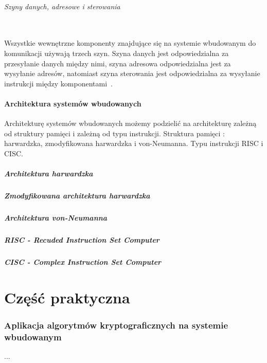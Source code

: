 \documentclass[12p]{article}
\begin{document}
\paragraph{Szyny danych, adresowe i sterowania} \mbox{} \\

Wszystkie wewnętrzne komponenty znajdujące się na systemie wbudowanym  do komunikacji używają trzech szyn. Szyna danych jest odpowiedzialna za przesyłanie danych między nimi, szyna adresowa odpowiedzialna jest za wysyłanie adresów, natomiast szyna sterowania jest odpowiedzialna za wysyłanie instrukcji między komponentami~\cite{es}.


\subsection{Architektura systemów wbudowanych}
\quad Architekturę systemów wbudowanych możemy podzielić na architekturę zależną od struktury pamięci i zależną od typu instrukcji. Struktura pamięci : harwardzka, zmodyfikowana harwardzka i von-Neumanna. Typu instrukcji RISC i CISC.
\subsubsection{Architektura harwardzka}
\subsubsection{Zmodyfikowana architektura harwardzka}
\subsubsection{Architektura von-Neumanna}
\subsubsection{RISC - Recuded Instruction Set Computer}
\subsubsection{CISC - Complex Instruction Set Computer}

\newpage
\part{Część praktyczna}
\section{Aplikacja algorytmów kryptograficznych na systemie wbudowanym}
  ...
\end{document}
